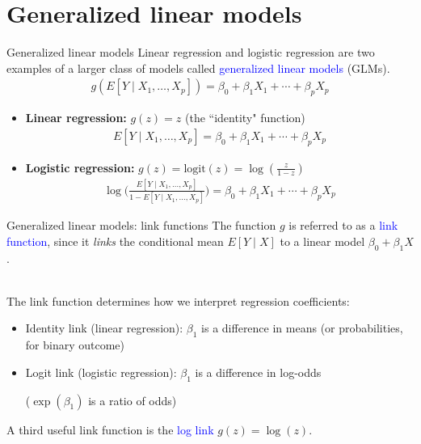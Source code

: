 \documentclass[10pt,t]{beamer}
\begin{document}
\section{Generalized linear models}

\begin{frame}{Generalized linear models}
	Linear regression and logistic regression are two examples of a  larger class of models called \textcolor{blue}{generalized linear models} (GLMs).
	\begin{align*}
		g(E[Y \mid X_1,\dots, X_p]) = \beta_0 + \beta_1X_1 + \cdots + \beta_pX_p
	\end{align*}
	\begin{itemize}
		\item \textbf{Linear regression:} $g(z) = z$ (the ``identity" function)
		\begin{align*}
			E[Y \mid X_1,\dots, X_p] = \beta_0 + \beta_1X_1 + \cdots + \beta_pX_p
		\end{align*}
	
		\item \textbf{Logistic regression:} $g(z) = \text{logit}(z) = \log(\frac{z}{1-z})$
		\begin{align*}
			\log\biggr(\frac{E[Y \mid X_1,\dots, X_p]}{1 - E[Y \mid X_1,\dots, X_p]}\biggr) = \beta_0 + \beta_1X_1 + \cdots+ \beta_pX_p
		\end{align*}
	\end{itemize}
\end{frame}

\begin{frame}{Generalized linear models: link functions}
	The function $g$ is referred to as a \textcolor{blue}{link function}, since it \textit{links} the conditional mean $E[Y \mid X]$ to a linear model $\beta_0 + \beta_1X$. 
	\\ ~\
	
	The link function determines how we interpret regression coefficients: 
	\begin{itemize}
		\item Identity link (linear regression): $\beta_1$ is a difference in means (or probabilities, for binary outcome)
		\item Logit link (logistic regression): $\beta_1$ is a difference in log-odds \begin{footnotesize}($\exp(\beta_1)$ is a ratio of odds)\end{footnotesize}
	\end{itemize}
	A third useful link function is the \textcolor{blue}{log link} $g(z) = \log(z)$. 
\end{frame}
\end{document}
